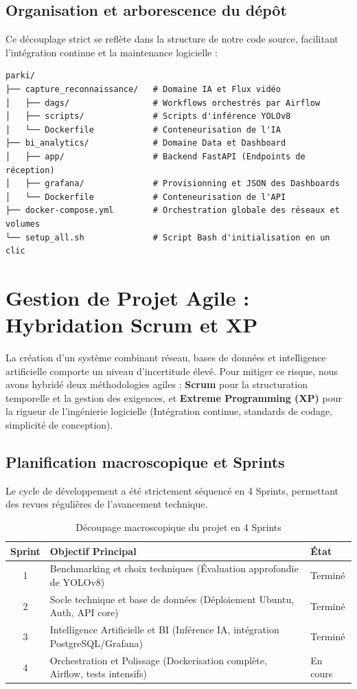 \subsection{Organisation et arborescence du dépôt}
Ce découplage strict se reflète dans la structure de notre code source, facilitant l'intégration continue et la maintenance logicielle :
\begin{verbatim}
parki/
├── capture_reconnaissance/   # Domaine IA et Flux vidéo
│   ├── dags/                 # Workflows orchestrés par Airflow
│   ├── scripts/              # Scripts d'inférence YOLOv8
│   └── Dockerfile            # Conteneurisation de l'IA
├── bi_analytics/             # Domaine Data et Dashboard
│   ├── app/                  # Backend FastAPI (Endpoints de réception)
│   ├── grafana/              # Provisionning et JSON des Dashboards
│   └── Dockerfile            # Conteneurisation de l'API
├── docker-compose.yml        # Orchestration globale des réseaux et volumes
└── setup_all.sh              # Script Bash d'initialisation en un clic
\end{verbatim}

\section{Gestion de Projet Agile : Hybridation Scrum et XP}

La création d'un système combinant réseau, bases de données et intelligence artificielle comporte un niveau d'incertitude élevé. Pour mitiger ce risque, nous avons hybridé deux méthodologies agiles : \textbf{Scrum} pour la structuration temporelle et la gestion des exigences, et \textbf{Extreme Programming (XP)} pour la rigueur de l'ingénierie logicielle (Intégration continue, standards de codage, simplicité de conception).

\subsection{Planification macroscopique et Sprints}
Le cycle de développement a été strictement séquencé en 4 Sprints, permettant des revues régulières de l'avancement technique.

\begin{table}[H]
    \centering
    \begin{tabular}{|c|p{8cm}|l|}
        \hline
        \textbf{Sprint} & \textbf{Objectif Principal} & \textbf{État} \\
        \hline
        1 & Benchmarking et choix techniques (Évaluation approfondie de YOLOv8) & Terminé \\
        2 & Socle technique et base de données (Déploiement Ubuntu, Auth, API core) & Terminé \\
        3 & Intelligence Artificielle et BI (Inférence IA, intégration PostgreSQL/Grafana) & Terminé \\
        4 & Orchestration et Polissage (Dockerisation complète, Airflow, tests intensifs) & En cours \\
        \hline
    \end{tabular}
    \caption{Découpage macroscopique du projet en 4 Sprints}
\end{table}

